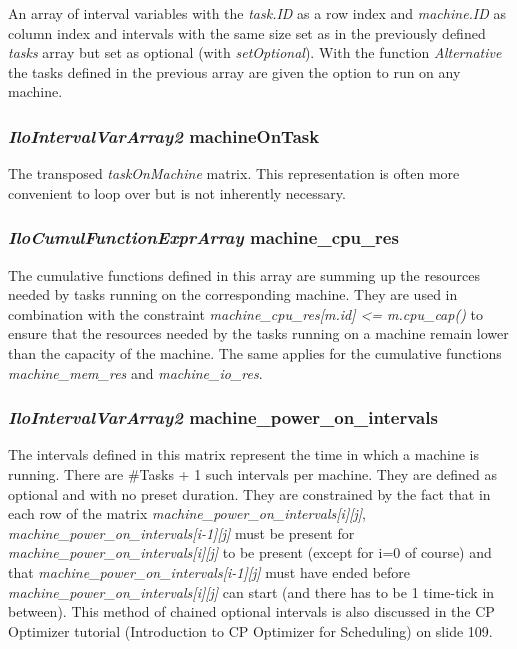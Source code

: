 An array of interval variables with the \textit{task.ID} as a row index and \textit{machine.ID} as column index and intervals with the same size set as in the previously defined \textit{tasks} array but set as optional (with \textit{setOptional}).
With the function \textit{Alternative} the tasks defined in the previous array are given the option to run on any machine. 

\subsubsection{\textit{IloIntervalVarArray2} machineOnTask}

The transposed \textit{taskOnMachine} matrix. This representation is often more convenient to loop over but is not inherently necessary. 

\subsubsection{\textit{IloCumulFunctionExprArray} machine\_cpu\_res}

The cumulative functions defined in this array are summing up the resources needed by tasks running on the corresponding machine. They are used in combination with the constraint \textit{machine\_cpu\_res[m.id] <= m.cpu\_cap()} to ensure that the resources needed by the tasks running on a machine remain lower than the capacity of the machine. The same applies for the cumulative functions \textit{machine\_mem\_res} and \textit{machine\_io\_res}.

\subsubsection{\textit{IloIntervalVarArray2} machine\_power\_on\_intervals}

The intervals defined in this matrix represent the time in which a machine is running. There are #Tasks + 1 such intervals per machine. They are defined as optional and with no preset duration. They are constrained by the fact that in each row of the matrix \textit{machine\_power\_on\_intervals[i][j]}, \textit{machine\_power\_on\_intervals[i-1][j]} must be present for \textit{machine\_power\_on\_intervals[i][j]} to be present (except for i=0 of course) and that \textit{machine\_power\_on\_intervals[i-1][j]} must have ended before \textit{machine\_power\_on\_intervals[i][j]} can start (and there has to be 1 time-tick in between). This method of chained optional intervals is also discussed in the CP Optimizer tutorial (Introduction to CP Optimizer for Scheduling) on slide 109.


